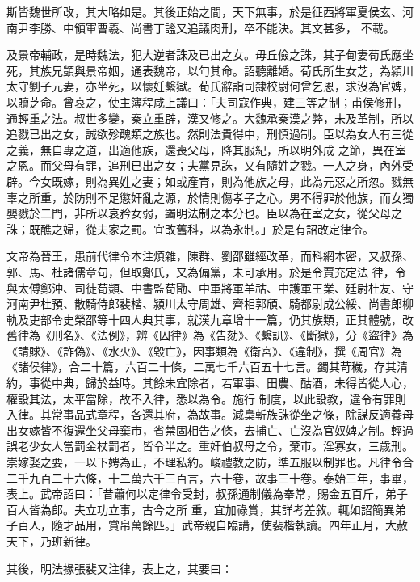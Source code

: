 \begin{pinyinscope}
 斯皆魏世所改，其大略如是。其後正始之間，天下無事，於是征西將軍夏侯玄、河南尹李勝、中領軍曹羲、尚書丁謐又追議肉刑，卒不能決。其文甚多，
 不載。



 及景帝輔政，是時魏法，犯大逆者誅及已出之女。毋丘儉之誅，其子甸妻荀氏應坐死，其族兄顗與景帝姻，通表魏帝，以匄其命。詔聽離婚。荀氏所生女芝，為潁川太守劉子元妻，亦坐死，以懷妊繫獄。荀氏辭詣司隸校尉何曾乞恩，求沒為官婢，以贖芝命。曾哀之，使主簿程咸上議曰：「夫司寇作典，建三等之制；甫侯修刑，通輕重之法。叔世多變，秦立重辟，漢又修之。大魏承秦漢之弊，未及革制，所以追戮已出之女，誠欲殄醜類之族也。然則法貴得中，刑慎過制。臣以為女人有三從之義，無自專之道，出適他族，還喪父母，降其服紀，所以明外成
 之節，異在室之恩。而父母有罪，追刑已出之女；夫黨見誅，又有隨姓之戮。一人之身，內外受辟。今女既嫁，則為異姓之妻；如或產育，則為他族之母，此為元惡之所忽。戮無辜之所重，於防則不足懲奸亂之源，於情則傷孝子之心。男不得罪於他族，而女獨嬰戮於二門，非所以哀矜女弱，蠲明法制之本分也。臣以為在室之女，從父母之誅；既醮之婦，從夫家之罰。宜改舊科，以為永制。」於是有詔改定律令。



 文帝為晉王，患前代律令本注煩雜，陳群、劉邵雖經改革，而科網本密，又叔孫、郭、馬、杜諸儒章句，但取鄭氏，又為偏黨，未可承用。於是令賈充定法
 律，令與太傅鄭沖、司徒荀顗、中書監荀勖、中軍將軍羊祜、中護軍王業、廷尉杜友、守河南尹杜預、散騎侍郎裴楷、潁川太守周雄、齊相郭頎、騎都尉成公綏、尚書郎柳軌及吏部令史榮邵等十四人典其事，就漢九章增十一篇，仍其族類，正其體號，改舊律為《刑名》、《法例》，辨《囚律》為《告劾》、《繫訊》、《斷獄》，分《盜律》為《請賕》、《詐偽》、《水火》、《毀亡》，因事類為《衛宮》、《違制》，撰《周官》為《諸侯律》，合二十篇，六百二十條，二萬七千六百五十七言。蠲其苛穢，存其清約，事從中典，歸於益時。其餘未宜除者，若軍事、田農、酤酒，未得皆從人心，權設其法，太平當除，故不入律，悉以為令。施行
 制度，以此設教，違令有罪則入律。其常事品式章程，各還其府，為故事。減梟斬族誅從坐之條，除謀反適養母出女嫁皆不復還坐父母棄市，省禁固相告之條，去捕亡、亡沒為官奴婢之制。輕過誤老少女人當罰金杖罰者，皆令半之。重奸伯叔母之令，棄市。淫寡女，三歲刑。崇嫁娶之要，一以下娉為正，不理私約。峻禮教之防，準五服以制罪也。凡律令合二千九百二十六條，十二萬六千三百言，六十卷，故事三十卷。泰始三年，事畢，表上。武帝詔曰：「昔蕭何以定律令受封，叔孫通制儀為奉常，賜金五百斤，弟子百人皆為郎。夫立功立事，古今之所
 重，宜加祿賞，其詳考差敘。輒如詔簡異弟子百人，隨才品用，賞帛萬餘匹。」武帝親自臨講，使裴楷執讀。四年正月，大赦天下，乃班新律。



 其後，明法掾張裴又注律，表上之，其要曰：




\end{pinyinscope}
